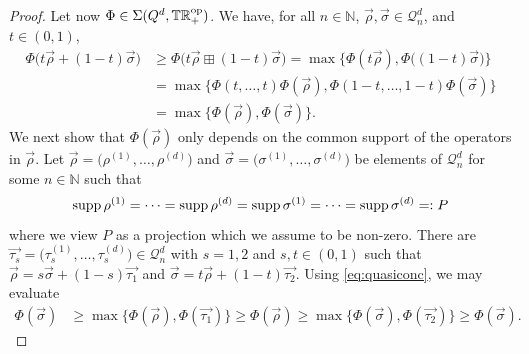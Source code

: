 \documentclass[12pt,a4paper,reqno]{amsart}
\theoremstyle{definition}
\newcommand{\mc}[1]{\mathcal{#1}}
\newcommand{\N}{\mathbb N}
\newcommand{\R}{\mathbb R}
\newcommand{\T}{\mathbb T}
\begin{document}
\begin{proof}
Let now $\Phi\in\Sigma(Q^d,\T\R_+^{\rm op})$. We have, for all $n\in\N$, $\vec{\rho},\vec{\sigma}\in\mc Q^d_n$, and $t\in(0,1)$,
\begin{align}
\Phi\big(t\vec{\rho}+(1-t)\vec{\sigma}\big)&\geq\Phi\big(t\vec{\rho}\boxplus(1-t)\vec{\sigma}\big)=\max\big\{\Phi(t\vec{\rho}),\Phi\big((1-t)\vec{\sigma}\big)\big\}\nonumber\\
&=\max\big\{\Phi(t,\ldots,t)\Phi(\vec{\rho}),\Phi(1-t,\ldots,1-t)\Phi(\vec{\sigma})\big\}\nonumber\\
&=\max\big\{\Phi(\vec{\rho}),\Phi(\vec{\sigma})\big\}.\label{eq:quasiconc}
\end{align}
We next show that $\Phi(\vec{\rho})$ only depends on the common support of the operators in $\vec{\rho}$. Let $\vec{\rho}=\big(\rho^{(1)},\ldots,\rho^{(d)}\big)$ and $\vec{\sigma}=\big(\sigma^{(1)},\ldots,\sigma^{(d)}\big)$ be elements of $\mc Q^d_n$ for some $n\in\N$ such that
$$
{\rm supp}\,\rho^{(1)}=\cdots={\rm supp}\,\rho^{(d)}={\rm supp}\,\sigma^{(1)}=\cdots={\rm supp}\,\sigma^{(d)}=:P
$$
where we view $P$ as a projection which we assume to be non-zero. There are $\vec{\tau_s}=\big(\tau_s^{(1)},\ldots,\tau_s^{(d)}\big)\in\mc Q^d_n$ with $s=1,2$ and $s,t\in(0,1)$ such that $\vec{\rho}=s\vec{\sigma}+(1-s)\vec{\tau_1}$ and $\vec{\sigma}=t\vec{\rho}+(1-t)\vec{\tau_2}$. Using \eqref{eq:quasiconc}, we may evaluate
\begin{align*}
\Phi(\vec{\sigma})&\geq\max\{\Phi(\vec{\rho}),\Phi(\vec{\tau_1})\}\geq\Phi(\vec{\rho})\geq\max\{\Phi(\vec{\sigma}),\Phi(\vec{\tau_2})\}\geq\Phi(\vec{\sigma}).

\end{align*}
\end{proof}
\end{document}
